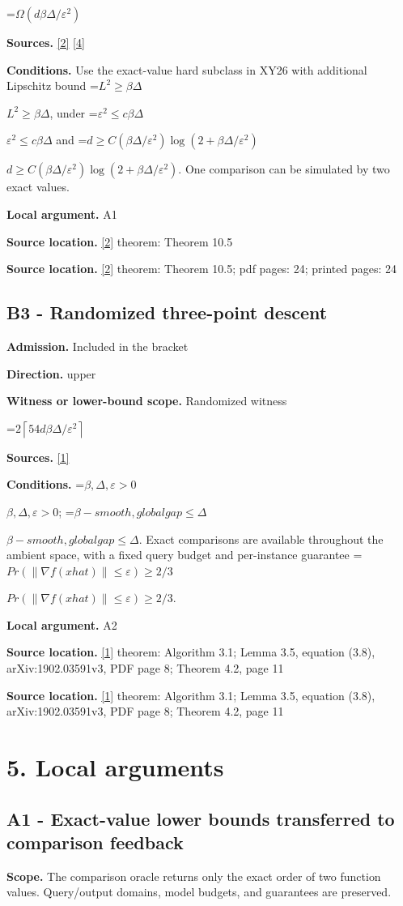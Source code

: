 \documentclass[10pt,a4paper]{article}
\newcommand{\AtlasMath}[1]{\par\begingroup\centering\setbox0=\hbox{$\displaystyle #1$}\ifdim\wd0>1.4\linewidth\typeout{ATLAS WIDE FORMULA: \the\wd0}\fi\ifdim\wd0>\linewidth\resizebox{\linewidth}{!}{\box0}\else\box0\fi\par\endgroup}
\newcommand{\AtlasInlineMath}[1]{\begingroup\setbox0=\hbox{$#1$}\ifdim\wd0>.4\linewidth\endgroup\AtlasMath{#1}\else\endgroup$#1$\fi}
\begin{document}
\AtlasMath{\Omega(d\beta\Delta/\varepsilon^2)}
\textbf{Sources.} \href{https://arxiv.org/html/2610.19652v1}{[2]} \href{https://arxiv.org/html/2610.00345v1}{[4]}

\textbf{Conditions.} Use the exact-value hard subclass in XY26 with additional Lipschitz bound \AtlasInlineMath{L^2\ge\beta\Delta}, under \AtlasInlineMath{\varepsilon^2\le c\beta\Delta} and \AtlasInlineMath{d\ge C(\beta\Delta/\varepsilon^2)\log(2+\beta\Delta/\varepsilon^2)}. One comparison can be simulated by two exact values.

\textbf{Local argument.} A1

\textbf{Source location.} \href{https://arxiv.org/html/2610.19652v1}{[2]} theorem: Theorem 10.5

\textbf{Source location.} \href{https://arxiv.org/html/2610.19652v1}{[2]} theorem: Theorem 10.5; pdf pages: 24; printed pages: 24

\subsection{B3 - Randomized three-point descent}
\textbf{Admission.} Included in the bracket

\textbf{Direction.} upper

\textbf{Witness or lower-bound scope.} Randomized witness

\AtlasMath{2\left\lceil54d\beta\Delta/\varepsilon^2\right\rceil}
\textbf{Sources.} \href{https://doi.org/10.1137/19M1244378}{[1]}

\textbf{Conditions.} \AtlasInlineMath{\beta ,\Delta ,\varepsilon >0}; \AtlasInlineMath{\beta -smooth,global gap\le \Delta}. Exact comparisons are available throughout the ambient space, with a fixed query budget and per-instance guarantee \AtlasInlineMath{Pr(\|\nabla f(xhat)\|\le \varepsilon )\ge 2/3}.

\textbf{Local argument.} A2

\textbf{Source location.} \href{https://doi.org/10.1137/19M1244378}{[1]} theorem: Algorithm 3.1; Lemma 3.5, equation (3.8), arXiv:1902.03591v3, PDF page 8; Theorem 4.2, page 11

\textbf{Source location.} \href{https://doi.org/10.1137/19M1244378}{[1]} theorem: Algorithm 3.1; Lemma 3.5, equation (3.8), arXiv:1902.03591v3, PDF page 8; Theorem 4.2, page 11

\section{5. Local arguments}
\subsection{A1 - Exact-value lower bounds transferred to comparison feedback}
\textbf{Scope.} The comparison oracle returns only the exact order of two function values. Query/output domains, model budgets, and guarantees are preserved.
\end{document}
